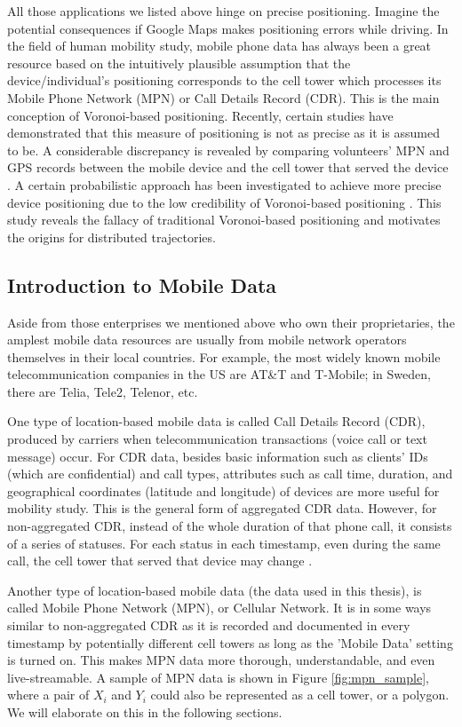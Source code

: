 \documentclass[12pt]{article}
\theoremstyle{definition}
\begin{document}
All those applications we listed above hinge on precise positioning. Imagine the potential consequences if Google Maps makes positioning errors while driving. In the field of human mobility study, mobile phone data has always been a great resource based on the intuitively plausible assumption that the device/individual’s positioning corresponds to the cell tower which processes its Mobile Phone Network (MPN) or Call Details Record (CDR). This is the main conception of Voronoi-based positioning. Recently, certain studies have demonstrated that this measure of positioning is not as precise as it is assumed to be. A considerable discrepancy is revealed by comparing volunteers’ MPN and GPS records between the mobile device and the cell tower that served the device \cite{closest_antenna_fallacy_2021}. A certain probabilistic approach has been investigated to achieve more precise device positioning due to the low credibility of Voronoi-based positioning \cite{prob_posit_mpn_2021}. This study reveals the fallacy of traditional Voronoi-based positioning and motivates the origins for distributed trajectories.

\subsection{Introduction to Mobile Data}
\label{sec:mobile_data}
Aside from those enterprises we mentioned above who own their proprietaries, the amplest mobile data resources are usually from mobile network operators themselves in their local countries. For example, the most widely known mobile telecommunication companies in the US are AT\&T and T-Mobile; in Sweden, there are Telia, Tele2, Telenor, etc. 

One type of location-based mobile data is called Call Details Record (CDR), produced by carriers when telecommunication transactions (voice call or text message) occur. For CDR data, besides basic information such as clients’ IDs (which are confidential) and call types, attributes such as call time, duration, and geographical coordinates (latitude and longitude) of devices are more useful for mobility study. This is the general form of aggregated CDR data. However, for non-aggregated CDR, instead of the whole duration of that phone call, it consists of a series of statuses. For each status in each timestamp, even during the same call, the cell tower that served that device may change \cite{prob_posit_mpn_2021}.

Another type of location-based mobile data (the data used in this thesis), is called Mobile Phone Network (MPN), or Cellular Network. It is in some ways similar to non-aggregated CDR as it is recorded and documented in every timestamp by potentially different cell towers as long as the 'Mobile Data' setting is turned on. This makes MPN data more thorough, understandable, and even live-streamable. A sample of MPN data is shown in Figure \ref{fig:mpn_sample}, where a pair of \(X_{i}\) and \(Y_{i}\) could also be represented as a cell tower, or a polygon. We will elaborate on this in the following sections. 
\end{document}
